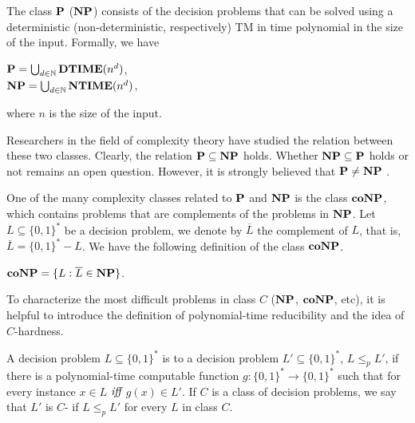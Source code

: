 \begin{definition}
	The class $\textbf{P}$ ($\textbf{NP}$) consists of the decision problems that can be solved using a 
	deterministic (non-deterministic, respectively) TM 
	in time polynomial in the size of the input.  Formally, we have
	\begin{center}
		$\textbf{P} = \bigcup_{d \in \mathbb{N}} \textbf{DTIME}(n^d)$,\\
		$\textbf{NP} = \bigcup_{d \in \mathbb{N}} \textbf{NTIME}(n^d)$,
	\end{center}
	where $n$ is the size of the input.
\end{definition}

Researchers in the field of complexity theory have studied
the relation between these two classes.
Clearly, the relation $\textbf{P} \subseteq \textbf{NP}$ holds. Whether
$\textbf{NP} \subseteq \textbf{P}$ holds or not remains an open question.
However, it is strongly believed that $\textbf{P} \not = \textbf{NP}$ \cite{gasarch2002p}. 


One of the many complexity classes related to $\textbf{P}$ and $\textbf{NP}$ \cite{gasarch2002p}
is the class $\textbf{coNP}$, which contains problems that are complements of 
the problems in $\textbf{NP}$.
Let $L \subseteq \{0,1\}^*$ be a decision problem, we denote by $\overline{L}$ the
complement of $L$, that is, $\overline{L} = \{0,1\}^*-L$.
We have the following definition of the class $\textbf{coNP}$.

\begin{definition}
	$\textbf{coNP} = \{L : \overline{L} \in \textbf{NP}\}$.
\end{definition}

To characterize the most difficult problems in class $C$ ($\textbf{NP}$, $\textbf{coNP}$, etc), 
it is helpful to introduce
the definition of polynomial-time reducibility \cite{gasarch2002p} and the 
idea of $C$-hardness.

\begin{definition}
	A decision problem $L \subseteq \{0,1\}^*$  is  to
	a decision problem $L' \subseteq \{0,1\}^*$, $L \leq_p L'$, if there is a
	polynomial-time computable function $g : \{0,1\}^* \rightarrow \{0,1\}^*$
	such that for every instance $x \in L$ $\textit{iff}$ $g(x) \in L'$.
	If $C$ is a class of decision problems, we say that 
	$L'$ is $C$- if $L \leq_p L'$ for 
	every $L$ in class $C$.
\end{definition}

